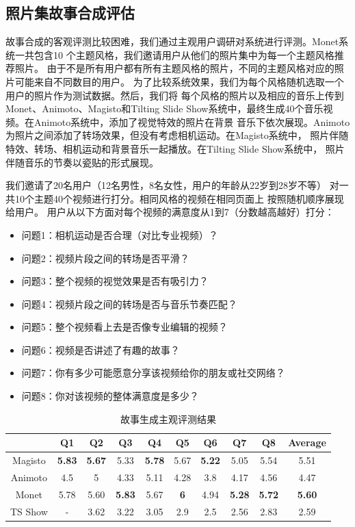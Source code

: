 \documentclass[doctor]{ustcthesis}
\begin{document}
\subsection{照片集故事合成评估}
故事合成的客观评测比较困难，我们通过主观用户调研对系统进行评测。Monet系统一共包含10
个主题风格，我们邀请用户从他们的照片集中为每一个主题风格推荐照片。
由于不是所有用户都有所有主题风格的照片，不同的主题风格对应的照片可能来自不同数目的用户。
为了比较系统效果，我们为每个风格随机选取一个用户的照片作为测试数据。然后，我们将
每个风格的照片以及相应的音乐上传到Monet、Animoto、Magisto和Tilting Slide
Show系统中，最终生成40个音乐视频。在Animoto系统中，添加了视觉特效的照片在背景
音乐下依次展现。Animoto为照片之间添加了转场效果，但没有考虑相机运动。在Magisto系统中，
照片伴随特效、转场、相机运动和背景音乐一起播放。在Tilting Slide Show系统中，
照片伴随音乐的节奏以瓷贴的形式展现。

我们邀请了20名用户（12名男性，8名女性，用户的年龄从22岁到28岁不等）
对一共10个主题40个视频进行打分。相同风格的视频在相同页面上
按照随机顺序展现给用户。
用户从以下方面对每个视频的满意度从1到7（分数越高越好）打分：
\begin{itemize}\setlength{\itemsep}{-0.5em}
    \item 问题1：相机运动是否合理（对比专业视频）？
    \item 问题2：视频片段之间的转场是否平滑？
    \item 问题3：整个视频的视觉效果是否有吸引力？
    \item 问题4：视频片段之间的转场是否与音乐节奏匹配？
    \item 问题5：整个视频看上去是否像专业编辑的视频？
    \item 问题6：视频是否讲述了有趣的故事？
    \item 问题7：你有多少可能愿意分享该视频给你的朋友或社交网络？
    \item 问题8：你对该视频的整体满意度是多少？
\end{itemize}


\begin{table}[t]
    \centering
    \caption{故事生成主观评测结果}
    \label{tab:monet-story-remixing-res}
    \begin{tabular}{|c|c|c|c|c|c|c|c|c|c|}
        \hline
        & Q1 & Q2 & Q3 & Q4 & Q5 & Q6 & Q7 & Q8 & Average  \\
        \hline
        Magisto & \textbf{5.83} &\textbf{5.67} & 5.33 & \textbf{5.78} & 5.67 & \textbf{5.22} & 5.05 & 5.54 & 5.51 \\
        Animoto & 4.5 & 5 & 4.33 & 5.11 & 4.28 & 3.8 & 4.17 & 4.56 & 4.47 \\
        Monet & 5.78 & 5.60& \textbf{5.83} & 5.67 & \textbf{6} & 4.94 & \textbf{5.28} & \textbf{5.72} & \textbf{5.60} \\
        TS Show & - & 3.62 & 3.22 & 3.05 & 2.9 & 2.5 & 2.56 & 2.83 & 2.59 \\ \hline
    \end{tabular}
\end{table}
\end{document}
